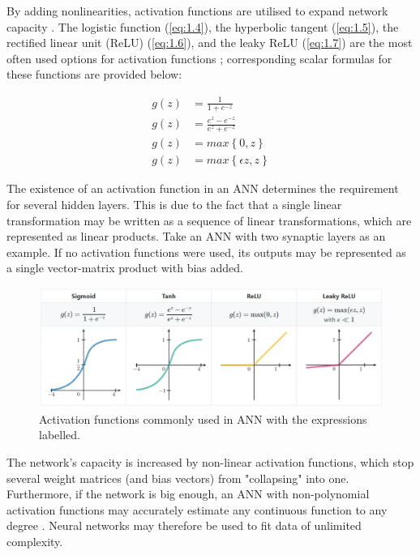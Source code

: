 \noindent By adding nonlinearities, activation functions are utilised to expand network capacity \cite{pomerat2019neural}. The logistic function (\ref{eq:1.4}), the hyperbolic tangent (\ref{eq:1.5}), the rectified linear unit (ReLU) (\ref{eq:1.6}), and the leaky ReLU (\ref{eq:1.7}) are the most often used options for activation functions \cite{zhang2018efficient}; corresponding scalar formulas for these functions are provided below:

\begin{align}
    g\left ( z \right ) &= \frac{1}{1 + e^{-z}} \label{eq:1.4} \\
    g\left ( z \right ) &= \frac{e^z - e^{-z}}{e^z + e^{-z}} \label{eq:1.5} \\
    g\left ( z \right ) &= max\left \{ 0, z \right \} \label{eq:1.6} \\
    g\left ( z \right ) &= max\left \{ \epsilon z, z \right \} \label{eq:1.7} 
\end{align}

\noindent The existence of an activation function in an ANN determines the requirement for several hidden layers. This is due to the fact that a single linear transformation may be written as a sequence of linear transformations, which are represented as linear products. Take an ANN with two synaptic layers as an example. If no activation functions were used, its outputs may be represented as a single vector-matrix product with bias added. \\

\begin{figure}[htbp!] 
\centering    
\includegraphics[width=1\textwidth]{Chapter1/Figs/1j.png}
\caption[Activation functions commonly used in ANN]{Activation functions commonly used in ANN with the expressions labelled.}
\label{fig:1j}
\end{figure}

\noindent The network's capacity is increased by non-linear activation functions, which stop several weight matrices (and bias vectors) from "collapsing" into one. Furthermore, if the network is big enough, an ANN with non-polynomial activation functions may accurately estimate any continuous function to any degree \cite{leshno1993multilayer}. Neural networks may therefore be used to fit data of unlimited complexity.

